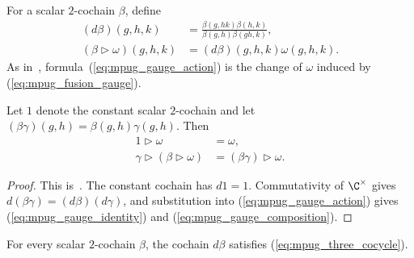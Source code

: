 \begin{definition}
    \label{def:mpug_fusion_gauge}
    \leanok
    For a scalar $2$-cochain $\beta$, define
    \begin{align}
        (d\beta)(g,h,k)
         & =\frac{\beta(g,hk)\beta(h,k)}
        {\beta(g,h)\beta(gh,k)},
        \label{eq:mpug_coboundary}        \\
        (\beta\mathbin{\triangleright}\omega)(g,h,k)
         & =(d\beta)(g,h,k)\omega(g,h,k).
        \label{eq:mpug_gauge_action}
    \end{align}
    As in~\cite{FrancoRubio2025MPUGauging}, formula~(\ref{eq:mpug_gauge_action})
    is the change of $\omega$ induced by (\ref{eq:mpug_fusion_gauge}).
\end{definition}

\begin{lemma}
    \label{thm:mpug_gauge_action}
    \leanok
    Let $1$ denote the constant scalar $2$-cochain and let
    $(\beta\gamma)(g,h)=\beta(g,h)\gamma(g,h)$. Then
    \begin{align}
        1\mathbin{\triangleright}\omega & =\omega,
        \label{eq:mpug_gauge_identity}                                                  \\
        \gamma\mathbin{\triangleright}
        (\beta\mathbin{\triangleright}\omega)
                                        & =(\beta\gamma)\mathbin{\triangleright}\omega.
        \label{eq:mpug_gauge_composition}
    \end{align}
\end{lemma}

\begin{proof}\leanok
    This is~\cite[``Identity and composition of gauges'']{QICLean2026Blueprint}.
    The constant cochain has $d1=1$. Commutativity of $\C^\times$ gives
    $d(\beta\gamma)=(d\beta)(d\gamma)$, and substitution into
    (\ref{eq:mpug_gauge_action}) gives
    (\ref{eq:mpug_gauge_identity}) and
    (\ref{eq:mpug_gauge_composition}).
\end{proof}

\begin{lemma}
    \label{thm:mpug_coboundary_cocycle}
    \leanok
    For every scalar $2$-cochain $\beta$, the cochain $d\beta$ satisfies
    (\ref{eq:mpug_three_cocycle}).
\end{lemma}

